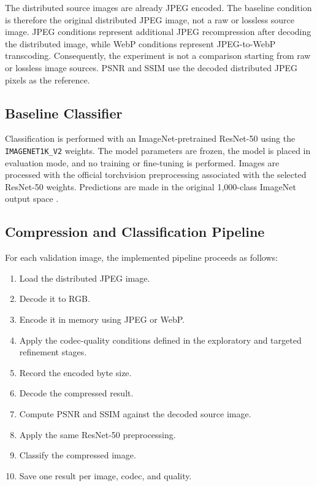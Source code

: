 The distributed source images are already JPEG encoded. The baseline condition is therefore the original distributed JPEG image, not a raw or lossless source image. JPEG conditions represent additional JPEG recompression after decoding the distributed image, while WebP conditions represent JPEG-to-WebP transcoding. Consequently, the experiment is not a comparison starting from raw or lossless image sources. PSNR and SSIM use the decoded distributed JPEG pixels as the reference.

\subsection{Baseline Classifier}

Classification is performed with an ImageNet-pretrained ResNet-50 \cite{he2016resnet} using the \texttt{IMAGENET1K\_V2} weights. The model parameters are frozen, the model is placed in evaluation mode, and no training or fine-tuning is performed. Images are processed with the official torchvision preprocessing associated with the selected ResNet-50 weights. Predictions are made in the original 1,000-class ImageNet output space \cite{torchvision_resnet50}.

\subsection{Compression and Classification Pipeline}

For each validation image, the implemented pipeline proceeds as follows:

\begin{enumerate}
    \item Load the distributed JPEG image.
    \item Decode it to RGB.
    \item Encode it in memory using JPEG or WebP.
    \item Apply the codec-quality conditions defined in the exploratory and targeted refinement stages.
    \item Record the encoded byte size.
    \item Decode the compressed result.
    \item Compute PSNR and SSIM against the decoded source image.
    \item Apply the same ResNet-50 preprocessing.
    \item Classify the compressed image.
    \item Save one result per image, codec, and quality.
\end{enumerate}


